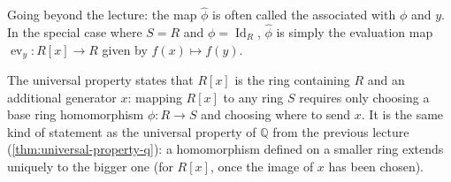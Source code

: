 \begin{content}

\begin{steps}
Going beyond the lecture: the map $\hat{\phi}$ is often called the  associated with $\phi$ and $y$. In the special case where $S = R$ and $\phi = \operatorname{Id}_R$, $\hat{\phi}$ is simply the evaluation map $\operatorname{ev}_y \colon R[x] \to R$ given by $f(x) \mapsto f(y)$. 

The universal property states that $R[x]$ is the  ring containing $R$ and an additional generator $x$: mapping $R[x]$ to any ring $S$ requires only choosing a base ring homomorphism $\phi \colon R \to S$ and choosing where to send $x$. It is the same kind of statement as the universal property of $\mathbb{Q}$ from the previous lecture (\cref{thm:universal-property-q}): a homomorphism defined on a smaller ring extends uniquely to the bigger one (for $R[x]$, once the image of $x$ has been chosen).
\end{steps}
\end{content}

